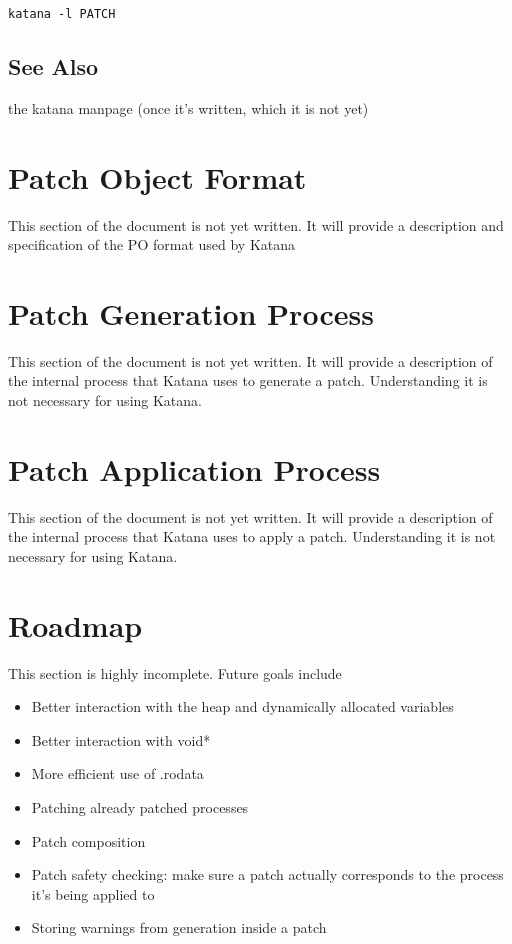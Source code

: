 \documentclass[11pt]{article}
\begin{document}
   \texttt{katana -l PATCH}
\subsection{See Also}
\label{sec-6.5}

   the katana manpage (once it's written, which it is not yet)
\section{Patch Object Format}
\label{sec-7}

  This section of the document is not yet written. It will provide a description and specification of the PO format used by Katana
\section{Patch Generation Process}
\label{sec-8}

  This section of the document is not yet written. It will provide a
  description of the internal process that Katana uses to generate a
  patch. Understanding it is not necessary for using Katana.
\section{Patch Application Process}
\label{sec-9}

  This section of the document is not yet written. It will provide a
  description of the internal process that Katana uses to apply a
  patch. Understanding it is not necessary for using Katana.
\section{Roadmap}
\label{sec-10}

  This section is highly incomplete. Future goals include
\begin{itemize}
\item Better interaction with the heap and dynamically allocated variables
\item Better interaction with void*
\item More efficient use of .rodata
\item Patching already patched processes
\item Patch composition
\item Patch safety checking: make sure a patch actually corresponds to
    the process it's being applied to
\item Storing warnings from generation inside a patch
\end{itemize}
\end{document}
